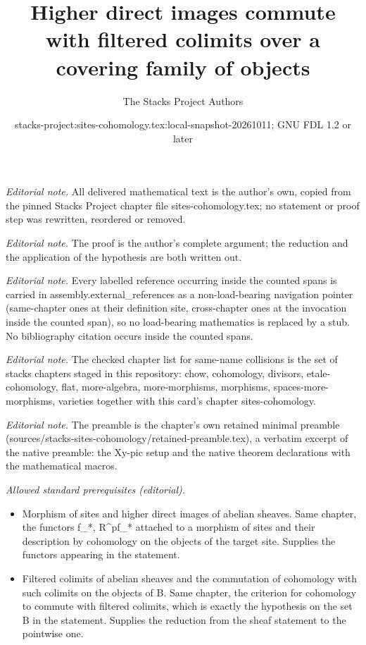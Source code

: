 \documentclass[10pt,a4paper]{amsart}
\title{Higher direct images commute with filtered colimits over a covering family of objects}
\author{The Stacks Project Authors}
\date{stacks-project:sites-cohomology.tex:local-snapshot-20261011; GNU FDL 1.2 or later}
\theoremstyle{plain}
\theoremstyle{definition}
\theoremstyle{remark}
\numberwithin{equation}{subsection}
\begin{document}
\maketitle
\noindent\textit{Editorial note.} All delivered mathematical text is the author's own, copied from the pinned Stacks Project chapter file sites-cohomology.tex; no statement or proof step was rewritten, reordered or removed.\par\medskip
\noindent\textit{Editorial note.} The proof is the author's complete argument; the reduction and the application of the hypothesis are both written out.\par\medskip
\noindent\textit{Editorial note.} Every labelled reference occurring inside the counted spans is carried in assembly.external\_references as a non-load-bearing navigation pointer (same-chapter ones at their definition site, cross-chapter ones at the invocation inside the counted span), so no load-bearing mathematics is replaced by a stub. No bibliography citation occurs inside the counted spans.\par\medskip
\noindent\textit{Editorial note.} The checked chapter list for same-name collisions is the set of stacks chapters staged in this repository: chow, cohomology, divisors, etale-cohomology, flat, more-algebra, more-morphisms, morphisms, spaces-more-morphisms, varieties together with this card's chapter sites-cohomology.\par\medskip
\noindent\textit{Editorial note.} The preamble is the chapter's own retained minimal preamble (sources/stacks-sites-cohomology/retained-preamble.tex), a verbatim excerpt of the native preamble: the Xy-pic setup and the native theorem declarations with the mathematical macros.\par\medskip
\noindent\textit{Allowed standard prerequisites (editorial).}\begin{itemize}
\item Morphism of sites and higher direct images of abelian sheaves. Same chapter, the functors f\_*, R\textasciicircum{}pf\_* attached to a morphism of sites and their description by cohomology on the objects of the target site. Supplies the functors appearing in the statement.
\item Filtered colimits of abelian sheaves and the commutation of cohomology with such colimits on the objects of B. Same chapter, the criterion for cohomology to commute with filtered colimits, which is exactly the hypothesis on the set B in the statement. Supplies the reduction from the sheaf statement to the pointwise one.
\end{itemize}\medskip
\end{document}
